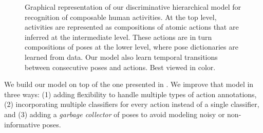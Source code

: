 \begin{figure}[tb]
\begin{center}
\fbox{\rule{0pt}{2in} \rule{0.9\linewidth}{0pt}}
\end{center}
   \caption{Graphical representation of our discriminative hierarchical model for recognition of composable human activities.
At the top level, activities are represented as compositions of atomic actions that are inferred at
the intermediate level. These actions are in turn compositions of poses at the
lower level, where pose dictionaries are learned from data. Our model also learn
temporal transitions between consecutive poses and actions. Best viewed in
color.}
\label{fig:overview}

\end{figure}

We build our model on top of the one presented in \cite{Lillo2014}. We improve that model in three ways: (1) adding flexibility to handle multiple types of action annotations, (2) incorporating multiple classifiers for every action instead of a single classifier, and (3) adding a \emph{garbage collector} of poses to avoid modeling noisy or non-informative poses. 










